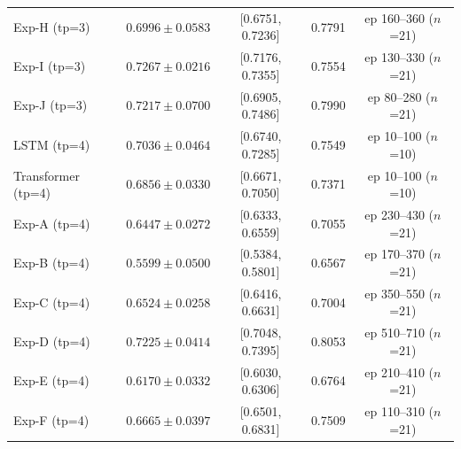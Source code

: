\begin{table}[htbp]
\begin{tabular}{l c c c c}
  Exp-H (tp=3) & $0.6996 \pm 0.0583$ & [0.6751, 0.7236] & 0.7791 & ep 160--360 ($n$=21) \\
  Exp-I (tp=3) & $0.7267 \pm 0.0216$ & [0.7176, 0.7355] & 0.7554 & ep 130--330 ($n$=21) \\
  Exp-J (tp=3) & $0.7217 \pm 0.0700$ & [0.6905, 0.7486] & 0.7990 & ep 80--280 ($n$=21) \\
  \midrule
  LSTM (tp=4) & $0.7036 \pm 0.0464$ & [0.6740, 0.7285] & 0.7549 & ep 10--100 ($n$=10) \\
  Transformer (tp=4) & $0.6856 \pm 0.0330$ & [0.6671, 0.7050] & 0.7371 & ep 10--100 ($n$=10) \\
  Exp-A (tp=4) & $0.6447 \pm 0.0272$ & [0.6333, 0.6559] & 0.7055 & ep 230--430 ($n$=21) \\
  Exp-B (tp=4) & $0.5599 \pm 0.0500$ & [0.5384, 0.5801] & 0.6567 & ep 170--370 ($n$=21) \\
  Exp-C (tp=4) & $0.6524 \pm 0.0258$ & [0.6416, 0.6631] & 0.7004 & ep 350--550 ($n$=21) \\
  Exp-D (tp=4) & $0.7225 \pm 0.0414$ & [0.7048, 0.7395] & 0.8053 & ep 510--710 ($n$=21) \\
  Exp-E (tp=4) & $0.6170 \pm 0.0332$ & [0.6030, 0.6306] & 0.6764 & ep 210--410 ($n$=21) \\
  Exp-F (tp=4) & $0.6665 \pm 0.0397$ & [0.6501, 0.6831] & 0.7509 & ep 110--310 ($n$=21) \\
\bottomrule
\end{tabular}
\end{table}
